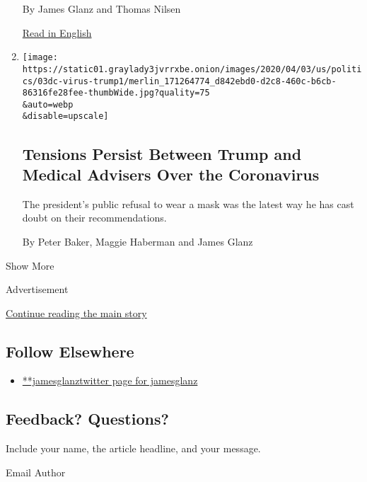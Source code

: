\begin{enumerate}
  By James Glanz and Thomas Nilsen

  \href{https://www.nytimes3xbfgragh.onion/2020/04/20/world/europe/russian-submarine-fire-losharik.html}{Read
  in English}
\item
  \href{/2020/04/03/us/politics/coronavirus-trump-medical-advisers.html}{}

  \texttt{[image: https://static01.graylady3jvrrxbe.onion/images/2020/04/03/us/politics/03dc-virus-trump1/merlin\_171264774\_d842ebd0-d2c8-460c-b6cb-86316fe28fee-thumbWide.jpg?quality=75\\\&auto=webp\\\&disable=upscale]}

  \hypertarget{tensions-persist-between-trump-and-medical-advisers-over-the-coronavirus}{%
  \subsection{Tensions Persist Between Trump and Medical Advisers Over
  the
  Coronavirus}\label{tensions-persist-between-trump-and-medical-advisers-over-the-coronavirus}}

  The president's public refusal to wear a mask was the latest way he
  has cast doubt on their recommendations.

  By Peter Baker, Maggie Haberman and James Glanz
\end{enumerate}

Show More

Advertisement

\protect\hyperlink{after-mid2}{Continue reading the main story}

\hypertarget{follow-elsewhere}{%
\subsection{Follow Elsewhere}\label{follow-elsewhere}}

\begin{itemize}
\tightlist
\item
  \href{https://twitter.com/jamesglanz}{**jamesglanztwitter page for
  jamesglanz}
\end{itemize}

\hypertarget{feedback-questions}{%
\subsection{Feedback? Questions?}\label{feedback-questions}}

Include your name, the article headline, and your message.

Email Author

